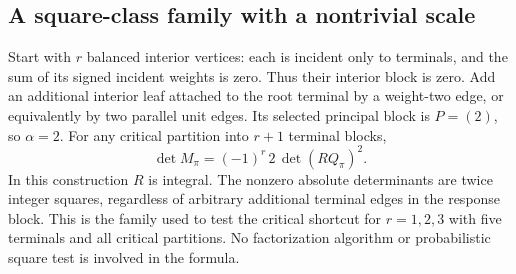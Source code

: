 \documentclass[11pt]{article}
\theoremstyle{definition}
\theoremstyle{remark}
\begin{document}
\subsection{A square-class family with a nontrivial scale}
Start with $r$ balanced interior vertices: each is incident only to terminals,
and the sum of its signed incident weights is zero. Thus their interior
block is zero. Add an additional interior leaf attached to the root
terminal by a weight-two edge, or equivalently by two parallel unit edges.
Its selected principal block is $P=(2)$, so $\alpha=2$. For any critical
partition into $r+1$ terminal blocks,
\[
 \det M_\pi=(-1)^r\,2\,\det(RQ_\pi)^2.
\]
In this construction $R$ is integral. The nonzero absolute determinants
are twice integer squares, regardless of arbitrary additional terminal
edges in the response block. This is the family used to test the critical
shortcut for $r=1,2,3$ with five terminals and all critical partitions.
No factorization algorithm or probabilistic square test is involved in the
formula.
\end{document}
